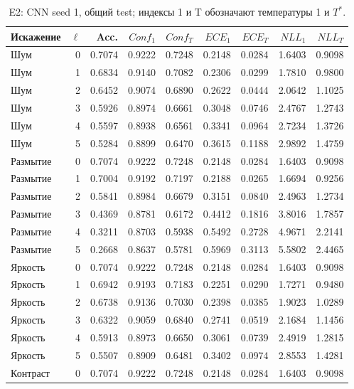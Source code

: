 \begin{table}[H]\centering\scriptsize
\setlength{\tabcolsep}{4pt}
\caption{E2: CNN seed 1, общий test; индексы 1 и T обозначают температуры 1 и $T^*$.}\label{tab:grid}
\begin{tabular}{lrrrrrrrr}
\toprule
Искажение & $\ell$ & Acc. & $Conf_1$ & $Conf_T$ & $ECE_1$ & $ECE_T$ & $NLL_1$ & $NLL_T$ \\
\midrule
Шум & 0 & 0.7074 & 0.9222 & 0.7248 & 0.2148 & 0.0284 & 1.6403 & 0.9098 \\
Шум & 1 & 0.6834 & 0.9140 & 0.7082 & 0.2306 & 0.0299 & 1.7810 & 0.9800 \\
Шум & 2 & 0.6452 & 0.9074 & 0.6890 & 0.2622 & 0.0444 & 2.0642 & 1.1025 \\
Шум & 3 & 0.5926 & 0.8974 & 0.6661 & 0.3048 & 0.0746 & 2.4767 & 1.2743 \\
Шум & 4 & 0.5597 & 0.8938 & 0.6561 & 0.3341 & 0.0964 & 2.7234 & 1.3726 \\
Шум & 5 & 0.5284 & 0.8899 & 0.6470 & 0.3615 & 0.1188 & 2.9892 & 1.4759 \\
Размытие & 0 & 0.7074 & 0.9222 & 0.7248 & 0.2148 & 0.0284 & 1.6403 & 0.9098 \\
Размытие & 1 & 0.7004 & 0.9192 & 0.7197 & 0.2188 & 0.0265 & 1.6694 & 0.9256 \\
Размытие & 2 & 0.5841 & 0.8984 & 0.6679 & 0.3151 & 0.0840 & 2.4963 & 1.2734 \\
Размытие & 3 & 0.4369 & 0.8781 & 0.6172 & 0.4412 & 0.1816 & 3.8016 & 1.7857 \\
Размытие & 4 & 0.3211 & 0.8703 & 0.5938 & 0.5492 & 0.2728 & 4.9671 & 2.2141 \\
Размытие & 5 & 0.2668 & 0.8637 & 0.5781 & 0.5969 & 0.3113 & 5.5802 & 2.4465 \\
Яркость & 0 & 0.7074 & 0.9222 & 0.7248 & 0.2148 & 0.0284 & 1.6403 & 0.9098 \\
Яркость & 1 & 0.6942 & 0.9193 & 0.7183 & 0.2251 & 0.0290 & 1.7271 & 0.9480 \\
Яркость & 2 & 0.6738 & 0.9136 & 0.7030 & 0.2398 & 0.0385 & 1.9023 & 1.0289 \\
Яркость & 3 & 0.6322 & 0.9059 & 0.6840 & 0.2741 & 0.0519 & 2.1684 & 1.1456 \\
Яркость & 4 & 0.5913 & 0.8973 & 0.6650 & 0.3061 & 0.0739 & 2.4919 & 1.2815 \\
Яркость & 5 & 0.5507 & 0.8909 & 0.6481 & 0.3402 & 0.0974 & 2.8553 & 1.4281 \\
Контраст & 0 & 0.7074 & 0.9222 & 0.7248 & 0.2148 & 0.0284 & 1.6403 & 0.9098 \\

\end{tabular}
\end{table}
